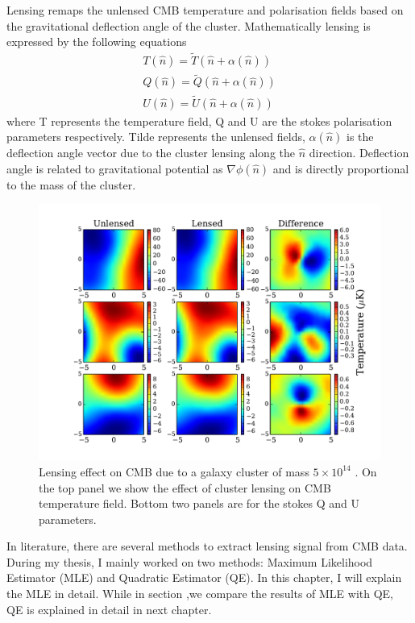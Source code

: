 Lensing remaps the unlensed CMB temperature and polarisation fields based on the gravitational deflection angle of the cluster. 
Mathematically lensing is expressed by the following equations
\begin{eqnarray}
T(\hat{n}) = \tilde{T}(\hat{n} + \alpha(\hat{n}))\\
Q(\hat{n}) = \tilde{Q}(\hat{n} + \alpha(\hat{n}))\\
U(\hat{n}) =  \tilde{U}(\hat{n} + \alpha(\hat{n}))
\end{eqnarray}
where T represents the temperature field, Q and U are the stokes polarisation parameters respectively. 
Tilde represents the unlensed fields, $\alpha(\hat{n})$ is the deflection angle vector due to the cluster lensing along the $\hat{n}$ direction. 
Deflection angle is related to gravitational potential as $\nabla \phi (\hat{n})$ and is directly proportional to the mass of the cluster.
\begin{figure}[ht]
\begin{center}
\includegraphics[width=\linewidth, keepaspectratio]{figs/lensing_signal.pdf}
 \caption{Lensing effect on CMB due to a galaxy cluster of mass $5\times 10^{14}$ \msolar.
  On the top panel we show the effect of cluster lensing on CMB temperature field.
  Bottom two panels are for the stokes Q and U parameters. 
 } 
\label{fig:lensing_signal}
\end{center}
\end{figure}
In literature, there are several methods to extract lensing signal from CMB data. 
During my thesis, I mainly worked on two methods: Maximum Likelihood Estimator (MLE) and Quadratic Estimator (QE). 
In this chapter, I will explain the MLE in detail. While in section ,we compare the results of MLE with QE, QE is explained in detail in next chapter.


